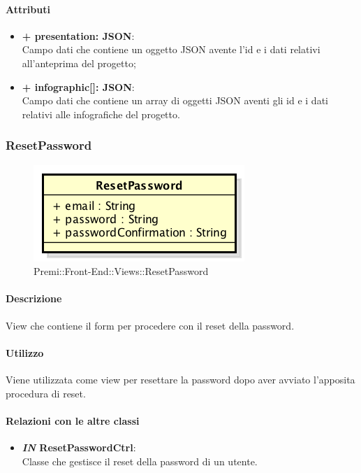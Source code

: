 	\paragraph{Attributi}
	\begin{itemize}
		\item \textbf{+ presentation: JSON}:\\
			Campo dati che contiene un oggetto \gls{JSON} avente l'id e i dati relativi all'anteprima del progetto;
		\item \textbf{+ infographic[]: JSON}:\\
			Campo dati che contiene un array di oggetti \gls{JSON} aventi gli id e i dati relativi alle infografiche del progetto.
	\end{itemize}
\newpage
	
	
\subsubsection{ResetPassword}
	\begin{figure}[h]
		\centering
		\includegraphics[width=0.3\linewidth]{img/premi_front_end_views_resetpassword}
		\caption[Premi::Front-End::Views::ResetPassword]{Premi::Front-End::Views::ResetPassword}
	\end{figure}
	
	\paragraph{Descrizione}
	View che contiene il form per procedere con il reset della password.
	
	\paragraph{Utilizzo}
	Viene utilizzata come view per resettare la password dopo aver avviato l'apposita procedura di reset.
	
	\paragraph{Relazioni con le altre classi}
	\begin{itemize}
		\item \textbf{\textit{IN} ResetPasswordCtrl}:\\
		Classe che gestisce il reset della password di un utente.
	\end{itemize}
	
